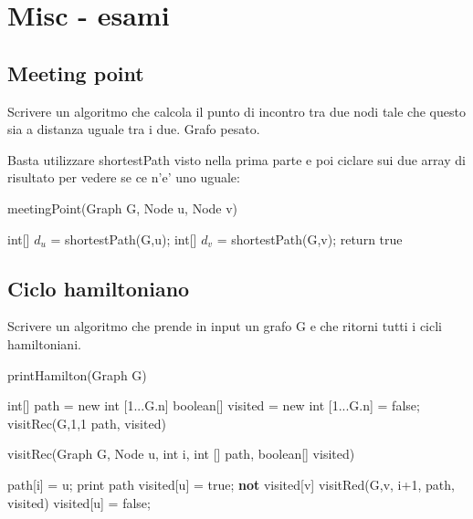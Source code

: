 \documentclass[oneside]{book}
\begin{document}
\chapter{Misc - esami}

\section{Meeting point}
Scrivere un algoritmo che calcola il punto di incontro tra due nodi tale che questo sia a distanza uguale tra i due. Grafo pesato.

Basta utilizzare shortestPath visto nella prima parte e poi ciclare sui due array di risultato per vedere se ce n'e' uno uguale:

\begin{algorithm}
\caption{meetingPoint(Graph G, Node u, Node v)\label{cap:alg}}
\begin{algorithmic}
\State int[] $d_u$ = shortestPath(G,u);
\State int[] $d_v$ = shortestPath(G,v);
		\State return true
	\EndIf
\EndFor
\end{algorithmic}
\end{algorithm}
\newpage

\section{Ciclo hamiltoniano}
Scrivere un algoritmo che prende in input un grafo G e che ritorni tutti i cicli hamiltoniani.

\begin{algorithm}
\caption{printHamilton(Graph G)\label{alg:cap}}
\begin{algorithmic}
\State int[] path = new int [1...G.n]
\State boolean[] visited = new int [1...G.n] = false;
\State visitRec(G,1,1 path, visited)
\end{algorithmic}
\end{algorithm}


\begin{algorithm}
\caption{visitRec(Graph G, Node u, int i, int [] path, boolean[] visited)\label{alg:cap}}
\begin{algorithmic}
\State path[i] = u;
		\State print path
	\EndIf
\Else
	\State visited[u] = true;
		\If \textbf{not} visited[v]
			\State visitRed(G,v, i+1, path, visited)
		\EndIf
		\State visited[u] = false;
	\EndFor
\EndIf


\end{algorithmic}
\end{algorithm}
\end{document}

